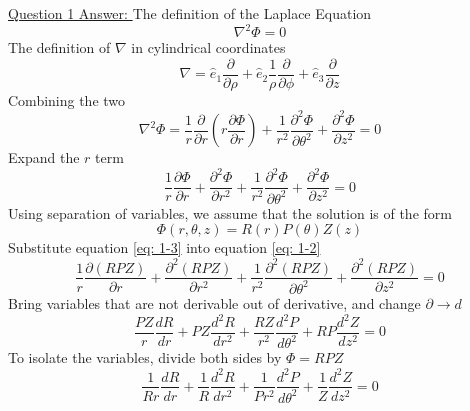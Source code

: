 \documentclass[12pt]{article}
\begin{document}
    \underline{Question 1 Answer: }
    The definition of the Laplace Equation
    \begin{equation} \label{eq: 1-0.1}
        \nabla^2 \Phi = 0
    \end{equation}
    The definition of $\nabla$ in cylindrical coordinates
    \begin{equation} \label{eq: 1-0.2}
        \nabla = \hat{e}_1 \frac{\partial}{\partial \rho} + \hat{e}_2 \frac{1}{\rho} \frac{\partial}{\partial \phi} + \hat{e}_3 \frac{\partial}{\partial z}
    \end{equation}
    Combining the two
    \begin{equation} \label{eq: 1-1}
        \nabla^2 \Phi = \frac{1}{r} \frac{\partial}{\partial r} \left(r \frac{\partial \Phi}{\partial r} \right) + \frac{1}{r^2} \frac{\partial^2 \Phi}{\partial \theta^2} + \frac{\partial^2 \Phi}{\partial z^2} = 0
    \end{equation}
    Expand the $r$ term
    \begin{equation} \label{eq: 1-2}
        \frac{1}{r} \frac{\partial \Phi}{\partial r} + \frac{\partial^2 \Phi}{\partial r^2} + \frac{1}{r^2} \frac{\partial^2 \Phi}{\partial \theta^2} + \frac{\partial^2 \Phi}{\partial z^2} = 0
    \end{equation}
    Using separation of variables, we assume that the solution is of the form
    \begin{equation} \label{eq: 1-3}
        \Phi(r,\theta,z) = R(r) P(\theta) Z(z)
    \end{equation}
    Substitute equation \ref{eq: 1-3} into equation \ref{eq: 1-2}
    \begin{equation} \label{eq: 1-4}
        \frac{1}{r} \frac{\partial (RPZ)}{\partial r} + \frac{\partial^2 (RPZ)}{\partial r^2} + \frac{1}{r^2} \frac{\partial^2 (RPZ)}{\partial \theta^2} + \frac{\partial^2 (RPZ)}{\partial z^2} = 0
    \end{equation}
    Bring variables that are not derivable out of derivative, and change $\partial \rightarrow{} d$
    \begin{equation} \label{eq: 1-5}
        \frac{PZ}{r} \frac{dR}{dr} + PZ\frac{d^2 R}{d r^2} + \frac{RZ}{r^2} \frac{d^2 P}{d \theta^2} + RP \frac{d^2 Z}{d z^2} = 0
    \end{equation}
    To isolate the variables, divide both sides by $\Phi = RPZ$
    \begin{equation} \label{eq: 1-6}
        \frac{1}{Rr} \frac{dR}{dr} + \frac{1}{R}\frac{d^2 R}{d r^2} + \frac{1}{P r^2} \frac{d^2 P}{d \theta^2} + \frac{1}{Z} \frac{d^2 Z}{d z^2} = 0
    \end{equation}
\end{document}
